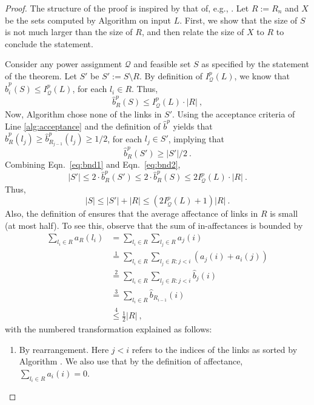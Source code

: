 \documentclass[11pt]{amsart}
\newcommand{\cal}[1]{\mathcal{#1}}
\def\calQ{{\cal Q}}
\def\SetR{R}
\begin{document}
\begin{proof}
The structure of the proof is inspired by that of, e.g., \cite{KesselheimSoda11}. 
Let $\SetR := \SetR_n$ and $X$ be the sets computed by Algorithm  on input $L$. 
First, we show that the size of $S$ is not much larger than the size of $\SetR$, and then relate the size of $X$ to $\SetR$ to conclude the statement.   


Consider any power assignment $\calQ$ and feasible set $S$ as specified by the statement of the theorem.
Let $S'$ be $S':=S\setminus \SetR$.
By definition of $I^p_{\calQ}(L)$, we know that  $\hat{b}^p_i(S) \leq I^p_{\calQ}(L)$, for each $l_i \in \SetR$. Thus, 
\begin{equation}
 \hat{b}^p_\SetR(S) \le  I^p_{\calQ}(L) \cdot |\SetR|\ ,
\label{eq:bnd1}
\end{equation}
Now, Algorithm  chose none of the links in $S'$. Using the acceptance criteria of Line \ref{alg:acceptance}  and the definition of $\hat{b}^p$ yields that 
$\hat{b}^p_\SetR(l_j) \ge \hat{b}^p_{\SetR_{j-1}}(l_j)\ge 1/2$, for each $l_j \in S'$, implying that
\begin{equation}
 \hat{b}^p_\SetR(S') \ge |S'|/2\ . 
\label{eq:bnd2}
\end{equation}
Combining Eqn.\ \ref{eq:bnd1} and Eqn.\ \ref{eq:bnd2},
\[ 
  |S'| \le 2 \cdot \hat{b}^p_\SetR(S') \le 2 \cdot \hat{b}^p_\SetR(S) \le 2 I^p_{\calQ}(L) \cdot |\SetR|\ . \]
Thus,
\begin{equation}
 |S| \le |S'| + |\SetR| \le (2 I^p_{\calQ}(L) + 1) |\SetR|\ . 
\label{eq:bnd3}
\end{equation}
Also, the definition of  ensures that the average affectance
of links in $\SetR$ is small (at most half). To see this, observe that
the sum of in-affectances is bounded by
\begin{align*}
\sum_{l_i \in \SetR} a_\SetR(l_i) 
&= \sum_{l_i \in \SetR} \sum_{l_j \in \SetR} a_j(i) 
\\
&\overset{1}{=} \sum_{l_i \in \SetR} \sum_{l_j \in \SetR: j < i} (a_j(i)+a_i(j)) 
\\
&\overset{2}{=} \sum_{l_i \in \SetR} \sum_{l_j \in \SetR: j < i} \hat b_j(i)
\\
&\overset{3}{=} \sum_{l_i \in \SetR} \hat b_{\SetR_{i-1}}(i)
\\
& \overset{4}{\leq} \frac12 |\SetR|\ ,
\end{align*}
with the numbered transformation explained as follows:
\begin{enumerate}
\item By rearrangement. Here $j < i$ refers to the indices of the links as sorted by Algorithm . We also use that by the definition of affectance, $\sum_{l_i \in \SetR}a_i(i)=0$.

\end{enumerate}
\end{proof}
\end{document}
